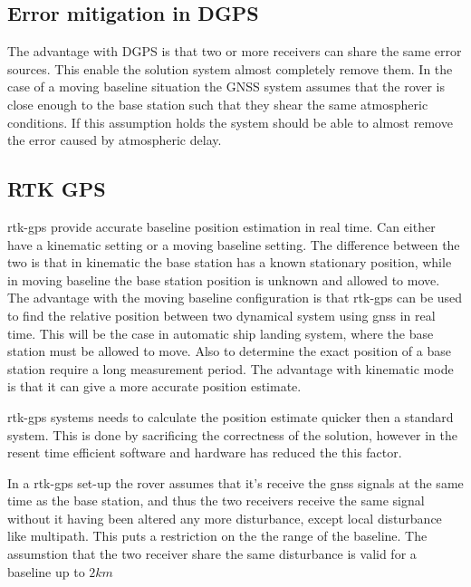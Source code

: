\subsection{Error mitigation in DGPS} \label{ss: Error mitigation DGPS}
The advantage with DGPS is that two or more receivers can share the same error sources. This enable the solution system almost completely remove them.
In the case of a moving baseline situation the GNSS system assumes that the rover is close enough to the base station such that they shear the same atmospheric conditions. If this assumption holds the system should be able to almost remove the error caused by atmospheric delay.


\subsection{RTK GPS}\label{ss:rtk-gps}
\gls{rtk-gps} provide accurate baseline position estimation in real time. Can either have a kinematic setting or a moving baseline setting. The difference between the two is that in kinematic the base station has a known stationary position, while in moving baseline the base station position is unknown and allowed to move. The advantage with the moving baseline configuration is that \gls{rtk-gps} can be used to find the relative position between two dynamical system using \gls{gnss} in real time. This will be the case in automatic ship landing system, where the base station must be allowed to move. Also to determine the exact position of a base station require a long measurement period. The advantage with kinematic mode is that it can give a more accurate position estimate.

\gls{rtk-gps} systems needs to calculate the position estimate quicker then a standard  system. This is done by sacrificing the correctness of the solution, however in the resent time efficient software and hardware has reduced the this factor.

In a \gls{rtk-gps} set-up the rover assumes that it's receive the \gls{gnss} signals at the same time as the base station, and thus the two receivers receive the same signal without it having been altered any more disturbance, except local disturbance like multipath. This puts a restriction on the the range of the baseline. The assumstion that the two receiver share the same disturbance is valid for a baseline up to $2km$
\cleardoublepage